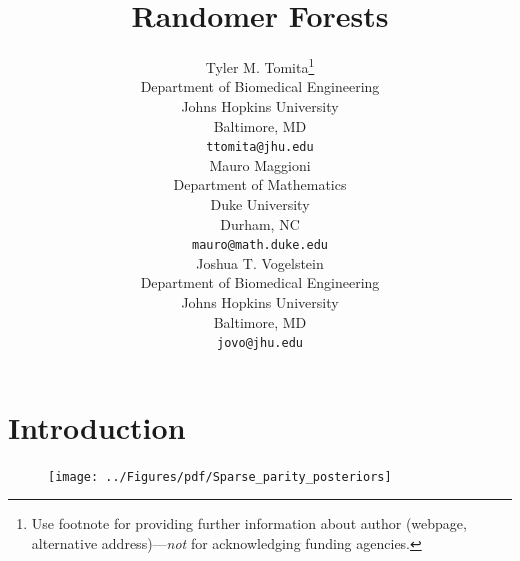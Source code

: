 \documentclass{article} %
\title{Randomer Forests}
\author{
Tyler M. Tomita\thanks{ Use footnote for providing further information
about author (webpage, alternative address)---\emph{not} for acknowledging
funding agencies.} \\
Department of Biomedical Engineering\\
Johns Hopkins University\\
Baltimore, MD \\
\texttt{ttomita@jhu.edu} \\
\And
Mauro Maggioni \\
Department of Mathematics \\
Duke University \\
Durham, NC \\
\texttt{mauro@math.duke.edu} \\
\And
Joshua T. Vogelstein \\
Department of Biomedical Engineering \\
Johns Hopkins University \\
Baltimore, MD \\
\texttt{jovo@jhu.edu} \\
}
\begin{document}
\maketitle
\vspace{-15pt}
\begin{abstract}

\end{abstract}

\section{Introduction}






\begin{figure}[h]
\begin{center}
\texttt{[image: ../Figures/pdf/Sparse\_parity\_posteriors]}
\end{center}
\caption{}
\label{fig:posteriors}
\end{figure}
\end{document}
